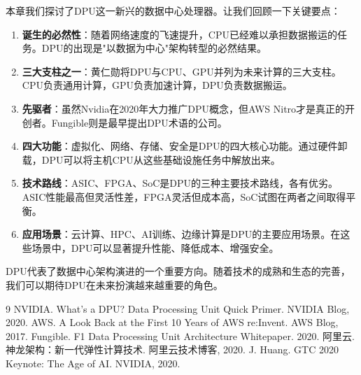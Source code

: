 本章我们探讨了DPU这一新兴的数据中心处理器。让我们回顾一下关键要点：

\begin{enumerate}
    \item \textbf{诞生的必然性}：随着网络速度的飞速提升，CPU已经难以承担数据搬运的任务。DPU的出现是"以数据为中心"架构转型的必然结果。
    
    \item \textbf{三大支柱之一}：黄仁勋将DPU与CPU、GPU并列为未来计算的三大支柱。CPU负责通用计算，GPU负责加速计算，DPU负责数据搬运。
    
    \item \textbf{先驱者}：虽然Nvidia在2020年大力推广DPU概念，但AWS Nitro才是真正的开创者。Fungible则是最早提出DPU术语的公司。
    
    \item \textbf{四大功能}：虚拟化、网络、存储、安全是DPU的四大核心功能。通过硬件卸载，DPU可以将主机CPU从这些基础设施任务中解放出来。
    
    \item \textbf{技术路线}：ASIC、FPGA、SoC是DPU的三种主要技术路线，各有优劣。ASIC性能最高但灵活性差，FPGA灵活但成本高，SoC试图在两者之间取得平衡。
    
    \item \textbf{应用场景}：云计算、HPC、AI训练、边缘计算是DPU的主要应用场景。在这些场景中，DPU可以显著提升性能、降低成本、增强安全。
\end{enumerate}

DPU代表了数据中心架构演进的一个重要方向。随着技术的成熟和生态的完善，我们可以期待DPU在未来扮演越来越重要的角色。

\begin{thebibliography}{9}
 NVIDIA. What's a DPU? Data Processing Unit Quick Primer. NVIDIA Blog, 2020.
 AWS. A Look Back at the First 10 Years of AWS re:Invent. AWS Blog, 2017.
 Fungible. F1 Data Processing Unit Architecture Whitepaper. 2020.
 阿里云. 神龙架构：新一代弹性计算技术. 阿里云技术博客, 2020.
 J. Huang. GTC 2020 Keynote: The Age of AI. NVIDIA, 2020.
\end{thebibliography}
